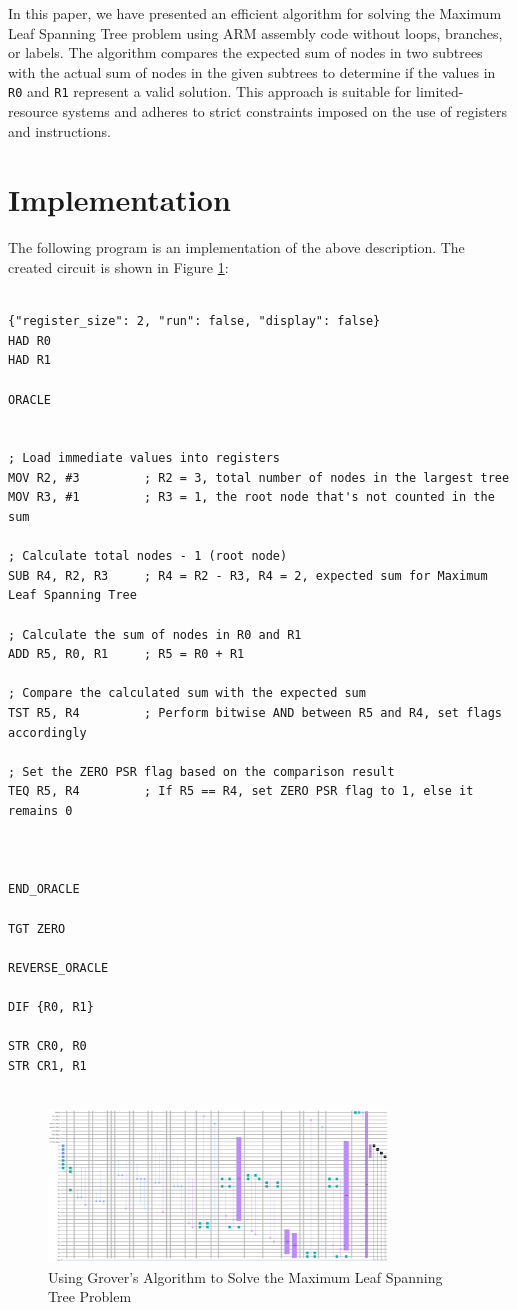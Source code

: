 In this paper, we have presented an efficient algorithm for solving the Maximum Leaf Spanning Tree problem using ARM assembly code without loops, branches, or labels. The algorithm compares the expected sum of nodes in two subtrees with the actual sum of nodes in the given subtrees to determine if the values in \texttt{R0} and \texttt{R1} represent a valid solution. This approach is suitable for limited-resource systems and adheres to strict constraints imposed on the use of registers and instructions.



\section{Implementation}

The following program is an implementation of the above description. The created circuit is shown in Figure \ref{fig:Maximum_Leaf_Spanning_Tree}:

\begin{lstlisting}

{"register_size": 2, "run": false, "display": false}
HAD R0
HAD R1

ORACLE


; Load immediate values into registers
MOV R2, #3         ; R2 = 3, total number of nodes in the largest tree
MOV R3, #1         ; R3 = 1, the root node that's not counted in the sum

; Calculate total nodes - 1 (root node)
SUB R4, R2, R3     ; R4 = R2 - R3, R4 = 2, expected sum for Maximum Leaf Spanning Tree

; Calculate the sum of nodes in R0 and R1
ADD R5, R0, R1     ; R5 = R0 + R1

; Compare the calculated sum with the expected sum
TST R5, R4         ; Perform bitwise AND between R5 and R4, set flags accordingly

; Set the ZERO PSR flag based on the comparison result
TEQ R5, R4         ; If R5 == R4, set ZERO PSR flag to 1, else it remains 0



END_ORACLE

TGT ZERO

REVERSE_ORACLE

DIF {R0, R1}

STR CR0, R0
STR CR1, R1


\end{lstlisting}

\begin{figure}[htp]
    \centering
    \includegraphics[width=9cm]{Figures/Maximum_Leaf_Spanning_Tree_circuit.png}
    \caption{Using Grover's Algorithm to Solve the Maximum Leaf Spanning Tree Problem}
    \label{fig:Maximum_Leaf_Spanning_Tree}
\end{figure}

